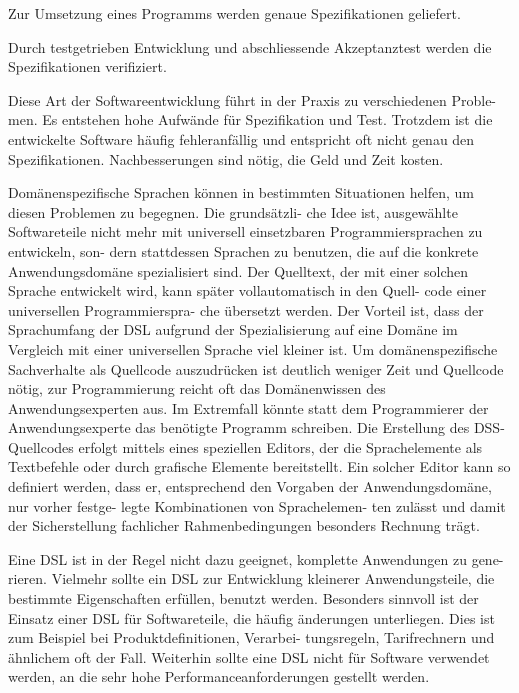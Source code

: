 \documentclass[11pt,english,ngerman, headsepline]{scrreprt}
\begin{document}
Zur Umsetzung eines Programms werden genaue Spezifikationen geliefert.  

Durch testgetrieben Entwicklung und abschliessende Akzeptanztest werden die
Spezifikationen verifiziert.




Diese Art der Softwareentwicklung führt in der Praxis zu verschiedenen Proble-
men. Es entstehen hohe Aufwände für Spezifikation und Test. Trotzdem ist die
entwickelte Software häufig fehleranfällig und entspricht oft nicht genau den
Spezifikationen. Nachbesserungen sind nötig, die Geld und Zeit kosten.
 
Domänenspezifische Sprachen können in bestimmten Situationen helfen, um diesen
Problemen zu begegnen. Die grundsätzli- che Idee ist, ausgewählte Softwareteile
nicht mehr mit universell einsetzbaren Programmiersprachen zu entwickeln, son-
dern stattdessen Sprachen zu benutzen, die auf die konkrete Anwendungsdomäne
spezialisiert sind. Der Quelltext, der mit einer solchen Sprache entwickelt
wird, kann später vollautomatisch in den Quell- code einer universellen
Programmierspra- che übersetzt werden. Der Vorteil ist, dass der Sprachumfang
der DSL aufgrund der Spezialisierung auf eine Domäne im Vergleich mit einer
universellen Sprache viel kleiner ist. Um domänenspezifische Sachverhalte als
Quellcode auszudrücken ist deutlich weniger Zeit und Quellcode nötig, zur
Programmierung reicht oft das  Domänenwissen des Anwendungsexperten aus. Im
Extremfall könnte statt dem Programmierer der Anwendungsexperte das benötigte
Programm schreiben. Die Erstellung des DSS-Quellcodes erfolgt mittels eines
speziellen Editors, der die Sprachelemente als Textbefehle oder durch grafische
Elemente bereitstellt.
Ein solcher Editor kann so definiert werden, dass er, entsprechend den Vorgaben
der Anwendungsdomäne, nur vorher festge- legte Kombinationen von Sprachelemen-
ten zulässt und damit der Sicherstellung fachlicher Rahmenbedingungen besonders
Rechnung trägt.


Eine DSL ist in der Regel nicht dazu geeignet, komplette Anwendungen zu gene-
rieren. Vielmehr sollte ein DSL zur Entwicklung kleinerer Anwendungsteile, die
bestimmte Eigenschaften erfüllen, benutzt werden. Besonders sinnvoll ist der
Einsatz einer DSL für Softwareteile, die häufig änderungen unterliegen. Dies
ist zum Beispiel bei Produktdefinitionen, Verarbei- tungsregeln, Tarifrechnern
und ähnlichem oft der Fall. Weiterhin sollte eine DSL nicht für Software
verwendet werden, an die sehr hohe Performanceanforderungen gestellt werden.
\cite{uniLeipzigTechRadar}
\end{document}
